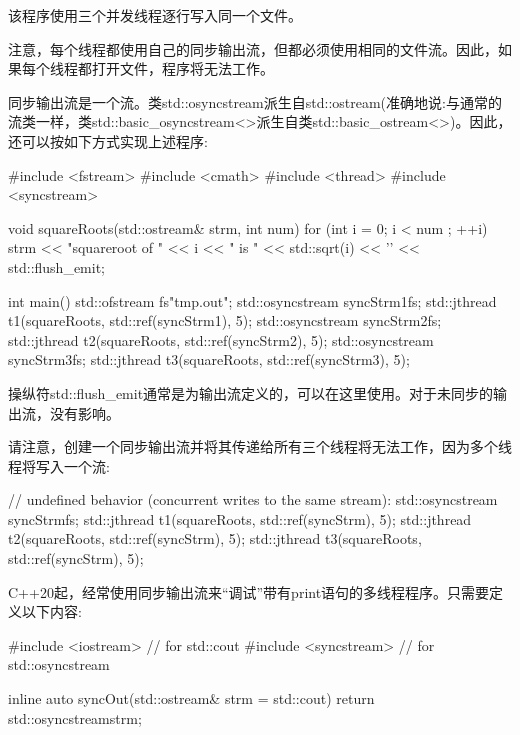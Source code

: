 该程序使用三个并发线程逐行写入同一个文件。

注意，每个线程都使用自己的同步输出流，但都必须使用相同的文件流。因此，如果每个线程都打开文件，程序将无法工作。


同步输出流是一个流。类std::osyncstream派生自std::ostream(准确地说:与通常的流类一样，类std::basic\_osyncstream<>派生自类std::basic\_ostream<>)。因此，还可以按如下方式实现上述程序:


\begin{cpp}
#include <fstream>
#include <cmath>
#include <thread>
#include <syncstream>

void squareRoots(std::ostream& strm, int num)
{
	for (int i = 0; i < num ; ++i) {
		strm << "squareroot of " << i << " is "
			 << std::sqrt(i) << '\n' << std::flush_emit;
	}
}

int main()
{
	std::ofstream fs{"tmp.out"};
	std::osyncstream syncStrm1{fs};
	std::jthread t1(squareRoots, std::ref(syncStrm1), 5);
	std::osyncstream syncStrm2{fs};
	std::jthread t2(squareRoots, std::ref(syncStrm2), 5);
	std::osyncstream syncStrm3{fs};
	std::jthread t3(squareRoots, std::ref(syncStrm3), 5);
}
\end{cpp}

操纵符std::flush\_emit通常是为输出流定义的，可以在这里使用。对于未同步的输出流，没有影响。

请注意，创建一个同步输出流并将其传递给所有三个线程将无法工作，因为多个线程将写入一个流:

\begin{cpp}
// undefined behavior (concurrent writes to the same stream):
std::osyncstream syncStrm{fs};
std::jthread t1(squareRoots, std::ref(syncStrm), 5);
std::jthread t2(squareRoots, std::ref(syncStrm), 5);
std::jthread t3(squareRoots, std::ref(syncStrm), 5);
\end{cpp}


C++20起，经常使用同步输出流来“调试”带有print语句的多线程程序。只需要定义以下内容:

\begin{cpp}
#include <iostream> // for std::cout
#include <syncstream> // for std::osyncstream

inline auto syncOut(std::ostream& strm = std::cout) {
	return std::osyncstream{strm};
}
\end{cpp}

